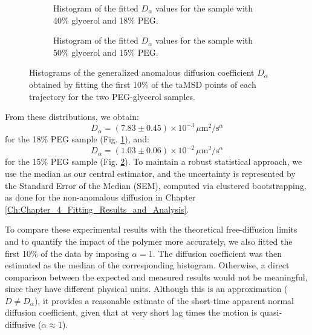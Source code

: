 \begin{figure}[!htbp]
    \centering
    \begin{subfigure}[t]{0.45\textwidth}
        \centering
        
        \caption{Histogram of the fitted $D_{\alpha}$ values for the sample with 40\% glycerol and 18\% PEG.}
        \label{Fig:Hist_a}
    \end{subfigure}
    \hfill
    \begin{subfigure}[t]{0.45\textwidth}
        \centering
        
        \caption{Histogram of the fitted $D_{\alpha}$ values for the sample with 50\% glycerol and 15\% PEG.}
        \label{Fig:Hist_b}
    \end{subfigure}

    \caption{Histograms of the generalized anomalous diffusion coefficient $D_{\alpha}$ obtained by fitting the first 10\% of the taMSD points of each trajectory for the two PEG-glycerol samples.}
    \label{fig:Dalpha_histograms_anomalous_samples}
\end{figure}

From these distributions, we obtain: $$D_{\alpha} = (7.83 \pm 0.45) \times 10^{-3}\,\mu\mathrm{m}^2/\mathrm{s}^{\alpha}$$ for the 18\% PEG sample (Fig. \ref{Fig:Hist_a}), and: $$D_{\alpha} = (1.03 \pm 0.06) \times 10^{-2}\,\mu\mathrm{m}^2/\mathrm{s}^{\alpha}$$ for the 15\% PEG sample (Fig. \ref{Fig:Hist_b}). To maintain a robust statistical approach, we use the median as our central estimator, and the uncertainty is represented by the Standard Error of the Median (SEM), computed via clustered bootstrapping, as done for the non-anomalous diffusion in Chapter \ref{Ch:Chapter_4_Fitting_Results_and_Analysis}.

To compare these experimental results with the theoretical free-diffusion limits and to quantify the impact of the polymer more accurately, we also fitted the first 10\% of the data by imposing $\alpha = 1$. The diffusion coefficient was then estimated as the median of the corresponding histogram. Otherwise, a direct comparison between the expected and measured results would not be meaningful, since they have different physical units. Although this is an approximation ($D \neq D_{\alpha}$), it provides a reasonable estimate of the short-time apparent normal diffusion coefficient, given that at very short lag times the motion is quasi-diffusive ($\alpha \approx 1$).

